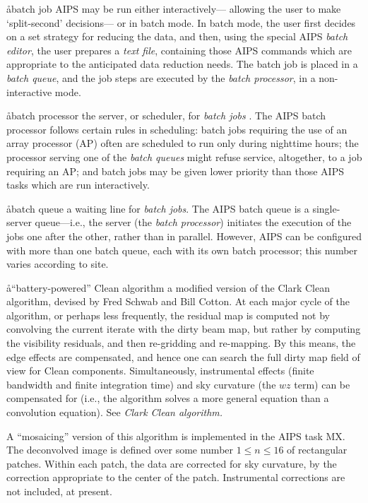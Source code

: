 \aa{batch job}
AIPS may be run either interactively---%
allowing the user to make `split-second' decisions---%
or in batch mode.
In batch mode, the user first decides on a set strategy for
reducing the data, and then, using the special AIPS {\it batch editor},
the user prepares a {\it text file},
containing those AIPS commands which are appropriate to the anticipated
data reduction needs.
The batch job is placed in a {\it batch queue},
and the job steps are executed by the {\it batch processor},
in a non-interactive mode.

\aa{batch processor}
the server, or scheduler, for {\it batch jobs} \qv.
The AIPS batch processor follows certain rules in scheduling:
batch jobs requiring the use of an array processor (AP)
often are scheduled to run only during nighttime hours;
the processor serving one of the {\it batch queues} might
refuse service, altogether, to a job requiring an AP;
and batch jobs may be given lower priority than those AIPS
tasks which are run interactively.

\aa{batch queue}
a waiting line for {\it batch jobs}.
The AIPS batch queue is a single-server queue---i.e.,
the server (the {\it batch processor}\/)
initiates the execution of the jobs one after the other,
rather than in parallel.
However, AIPS can be configured with more than one batch queue,
each with its own batch processor; this number varies according to site.

\aa{``battery-powered'' Clean algorithm}
a modified version of the Clark Clean algorithm, devised
by Fred Schwab and Bill Cotton.
At each major cycle of the algorithm, or perhaps less frequently,
the residual map is computed not by convolving the current
iterate with the dirty beam map,
but rather by computing the visibility residuals,
and then re-gridding and re-mapping.
By this means, the edge effects are compensated,
and hence one can search the full dirty map field of view
for Clean components.
Simultaneously, instrumental effects (finite bandwidth and
finite integration time) and sky curvature (the $wz$ term)
can be compensated for (i.e., the algorithm solves a more general
equation than a convolution equation).
See {\it Clark Clean algorithm.}
\par
A ``mosaicing'' version of this algorithm is implemented in the
AIPS task MX.
The deconvolved image is defined over some number $1\le n\le16$ of
rectangular patches.
Within each patch, the data are corrected for sky curvature,
by the correction appropriate to the center of the patch.
Instrumental corrections are not included, at present.

